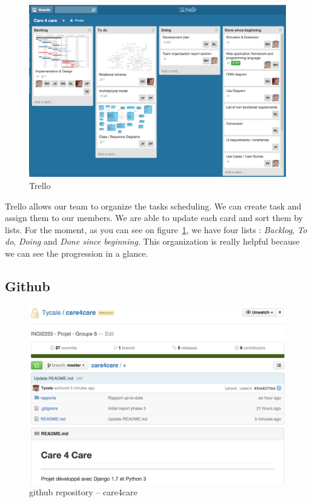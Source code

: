 \documentclass[11pt, a4paper]{article}   	%
\newcommand{\tit}[1]{\textit{#1}}
\begin{document}
\begin{figure}[!ht]
   \includegraphics[width=\textwidth]{trello.png}
   \caption{\label{trello} Trello}
\end{figure}

Trello allows our team to organize the tasks scheduling.
We can create task and assign them to our members.
We are able to update each card and sort them by lists.
For the moment, as you can see on figure~\ref{trello}, we have four lists : \tit{Backlog}, \tit{To do}, \tit{Doing} and \tit{Done since beginning}.
This organization is really helpful because we can see the progression in a glance.

\subsection{Github}

\begin{figure}[!ht]
   \includegraphics[width=\textwidth]{github.png}
   \caption{\label{github} github repository – care4care}
\end{figure}
\end{document}
